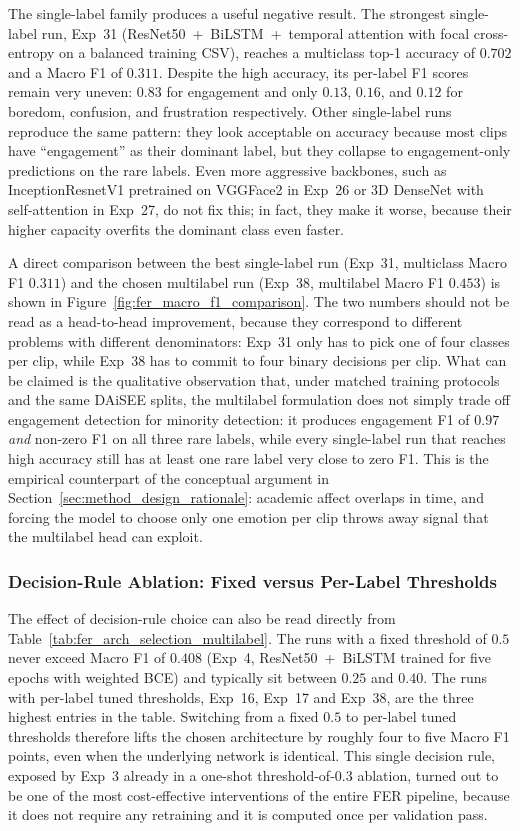 The single-label family produces a useful negative result. The strongest single-label run, Exp~31 (ResNet50~+~BiLSTM~+~temporal attention with focal cross-entropy on a balanced training CSV), reaches a multiclass top-1 accuracy of $0.702$ and a Macro F1 of $0.311$. Despite the high accuracy, its per-label F1 scores remain very uneven: $0.83$ for engagement and only $0.13$, $0.16$, and $0.12$ for boredom, confusion, and frustration respectively. Other single-label runs reproduce the same pattern: they look acceptable on accuracy because most clips have ``engagement'' as their dominant label, but they collapse to engagement-only predictions on the rare labels. Even more aggressive backbones, such as InceptionResnetV1 pretrained on VGGFace2 in Exp~26 or 3D DenseNet with self-attention in Exp~27, do not fix this; in fact, they make it worse, because their higher capacity overfits the dominant class even faster.

A direct comparison between the best single-label run (Exp~31, multiclass Macro F1 $0.311$) and the chosen multilabel run (Exp~38, multilabel Macro F1 $0.453$) is shown in Figure~\ref{fig:fer_macro_f1_comparison}. The two numbers should not be read as a head-to-head improvement, because they correspond to different problems with different denominators: Exp~31 only has to pick one of four classes per clip, while Exp~38 has to commit to four binary decisions per clip. What can be claimed is the qualitative observation that, under matched training protocols and the same DAiSEE splits, the multilabel formulation does not simply trade off engagement detection for minority detection: it produces engagement F1 of $0.97$ \emph{and} non-zero F1 on all three rare labels, while every single-label run that reaches high accuracy still has at least one rare label very close to zero F1. This is the empirical counterpart of the conceptual argument in Section~\ref{sec:method_design_rationale}: academic affect overlaps in time, and forcing the model to choose only one emotion per clip throws away signal that the multilabel head can exploit.

\subsubsection{Decision-Rule Ablation: Fixed versus Per-Label Thresholds}\label{sec:results_fer_threshold_ablation}

The effect of decision-rule choice can also be read directly from Table~\ref{tab:fer_arch_selection_multilabel}. The runs with a fixed threshold of $0.5$ never exceed Macro F1 of $0.408$ (Exp~4, ResNet50~+~BiLSTM trained for five epochs with weighted BCE) and typically sit between $0.25$ and $0.40$. The runs with per-label tuned thresholds, Exp~16, Exp~17 and Exp~38, are the three highest entries in the table. Switching from a fixed $0.5$ to per-label tuned thresholds therefore lifts the chosen architecture by roughly four to five Macro F1 points, even when the underlying network is identical. This single decision rule, exposed by Exp~3 already in a one-shot threshold-of-$0.3$ ablation, turned out to be one of the most cost-effective interventions of the entire FER pipeline, because it does not require any retraining and it is computed once per validation pass.

